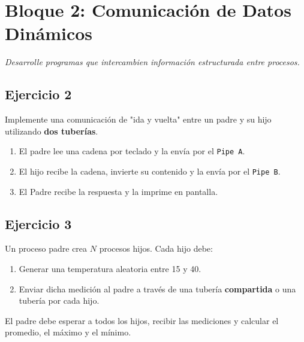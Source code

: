 \documentclass[12pt,a4paper]{article}
\begin{document}
\newpage

\section*{Bloque 2: Comunicación de Datos Dinámicos}
\textit{Desarrolle programas que intercambien información estructurada entre procesos.}

\subsection*{Ejercicio 2}
Implemente una comunicación de "ida y vuelta" entre un padre y su hijo utilizando \textbf{dos tuberías}.
\begin{enumerate}
    \item El padre lee una cadena por teclado y la envía por el \texttt{Pipe A}.
    \item El hijo recibe la cadena, invierte su contenido y la envía por el \texttt{Pipe B}.
    \item El Padre recibe la respuesta y la imprime en pantalla.
\end{enumerate}

\begin{center}
\end{center}

\newpage

\subsection*{Ejercicio 3}
Un proceso padre crea $N$ procesos hijos. Cada hijo debe:
\begin{enumerate}
    \item Generar una temperatura aleatoria entre 15 y 40.
    \item Enviar dicha medición al padre a través de una tubería \textbf{compartida} o una tubería por cada hijo.
\end{enumerate}
El padre debe esperar a todos los hijos, recibir las mediciones y calcular el promedio, el máximo y el mínimo.
\end{document}
